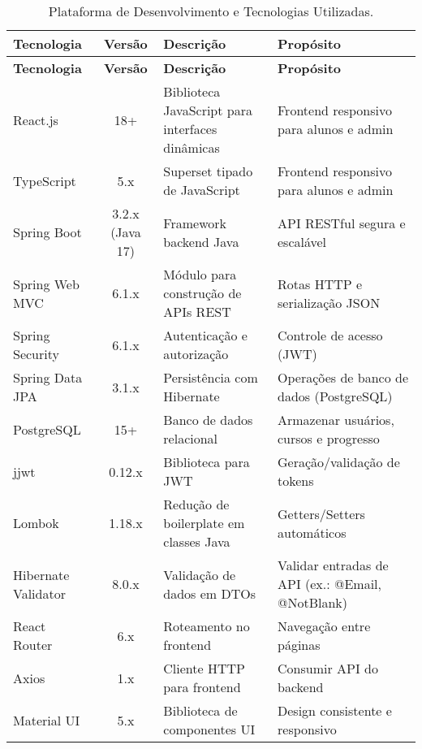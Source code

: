 \begin{footnotesize}
\begin{longtable}{|p{1.8cm}|c|p{5cm}|p{6.3cm}|}
	\caption{Plataforma de Desenvolvimento e Tecnologias Utilizadas.}	
	\label{tabela-plataforma}\\\hline

	\rowcolor{lightgray}
	\textbf{Tecnologia} & \textbf{Versão} & \textbf{Descrição} & \textbf{Propósito} \\\hline 
	\endfirsthead
	\hline
	\rowcolor{lightgray}
	\textbf{Tecnologia} & \textbf{Versão} & \textbf{Descrição} & \textbf{Propósito} \\\hline 
	\endhead
		
	React.js & 18+ & Biblioteca JavaScript para interfaces dinâmicas & Frontend responsivo para alunos e admin \\ \hline
	
	TypeScript & 5.x & Superset tipado de JavaScript & Frontend responsivo para alunos e admin \\ \hline
	
	Spring Boot & 3.2.x (Java 17) & Framework backend Java & API RESTful segura e escalável \\ \hline
	
	Spring Web MVC & 6.1.x & Módulo para construção de APIs REST & Rotas HTTP e serialização JSON \\ \hline
	
	Spring Security & 6.1.x & Autenticação e autorização & Controle de acesso (JWT) \\ \hline
	
	Spring Data JPA & 3.1.x & Persistência com Hibernate & Operações de banco de dados (PostgreSQL) \\ \hline
	
	PostgreSQL & 15+ & Banco de dados relacional & Armazenar usuários, cursos e progresso \\ \hline
	
	jjwt & 0.12.x & Biblioteca para JWT & Geração/validação de tokens \\ \hline
	
	Lombok & 1.18.x & Redução de boilerplate em classes Java & Getters/Setters automáticos \\ \hline
	
	Hibernate Validator & 8.0.x & Validação de dados em DTOs & Validar entradas de API (ex.: @Email, @NotBlank) \\ \hline
	
	React Router & 6.x & Roteamento no frontend & Navegação entre páginas \\ \hline
	
	Axios & 1.x & Cliente HTTP para frontend & Consumir API do backend \\ \hline
	
	Material UI & 5.x & Biblioteca de componentes UI & Design consistente e responsivo \\ \hline
	
\end{longtable}
\end{footnotesize}






